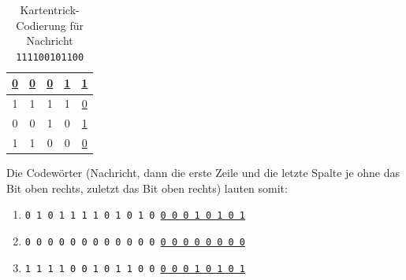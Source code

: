 \begin{myexercise}
\begin{myanswer}
        \begin{table}[H]
            \centering
            \begin{tabular}{ccccc}
                \underline{0} & \underline{0} & \underline{0} & \underline{1} & \underline{1} \\ \midrule
                1             & 1             & 1             & 1             & \underline{0} \\ \midrule
                0             & 0             & 1             & 0             & \underline{1} \\ \midrule
                1             & 1             & 0             & 0             & \underline{0} \\
            \end{tabular}
            \caption{Kartentrick-Codierung für Nachricht \texttt{111100101100}}
            \label{tab:codeword3}
        \end{table}
        Die Codewörter (Nachricht, dann die erste Zeile und die letzte Spalte je ohne das Bit oben rechts, zuletzt das Bit oben rechts) lauten somit:
        \begin{enumerate}
            \item \texttt{0 1 0 1 1 1 1 0 1 0 1 0 \underline{0 0 0 1 0 1 0 1}}
            \item \texttt{0 0 0 0 0 0 0 0 0 0 0 0 \underline{0 0 0 0 0 0 0 0}}
            \item \texttt{1 1 1 1 0 0 1 0 1 1 0 0 \underline{0 0 0 1 0 1 0 1}}
        \end{enumerate}
    \end{myanswer}
\end{myexercise}

